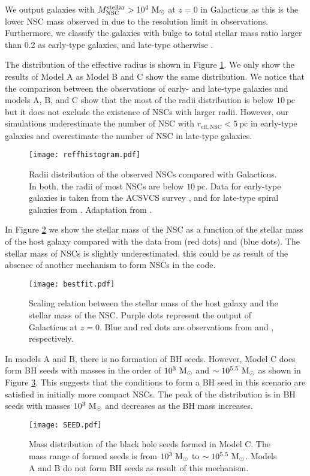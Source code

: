 \documentclass[baaa]{baaa}
\begin{document}
We output galaxies with $M_\mathrm{NSC}^\mathrm{stellar} > 10^{4}~{\rm M}_\odot$ at $z=0$ in {\sc Galacticus} as this is the lower NSC mass observed in \cite{COTE2006,GEORGIEV2016,SPENGLER2017} due to the resolution limit in observations.   Furthermore, we classify the galaxies  with  bulge to total stellar mass ratio larger than 0.2 as early-type galaxies, and late-type otherwise \citep{GRAHAM2008}.

The distribution of the effective radius is shown in Figure \ref{Reff}. We only show the results of Model A  as Model B and C show the same distribution. We notice that the comparison between the observations of early- and late-type galaxies and models A, B, and C show that the most of the radii distribution is below $10~\mathrm{pc}$ but it does not exclude the existence of NSCs with larger radii.
 However, our simulations underestimate the number of NSC with $r_\mathrm{eff,NSC} < 5~\mathrm{pc}$  in early-type galaxies and overestimate the number of NSC in late-type galaxies.

\begin{figure}[!t]
\texttt{[image: reffhistogram.pdf]}
\caption{Radii distribution of the observed NSCs compared with {\sc Galacticus}. In both, the radii of most NSCs are below $10~\mathrm{pc}$. Data for early-type galaxies is taken from the ACSVCS survey \cite{COTE2006}, and
for late-type spiral galaxies from \cite{GEORGIEV2016}. Adaptation from \cite{NEUMAYER2020}.}\label{Reff}
\end{figure}

In Figure \ref{Scale} we show the stellar mass of the NSC as a function of the stellar mass of the host galaxy compared with the data from \cite{SPENGLER2017} (red dots) and \cite{GEORGIEV2016} (blue dots). The stellar mass of NSCs is slightly underestimated, this could be as result of the absence of another mechanism to form NSCs in the code.

\begin{figure}[!t]
\texttt{[image: bestfit.pdf]}
\caption{Scaling relation between the stellar mass of the host galaxy and the stellar mass of the NSC. Purple dots represent the output of {\sc Galacticus} at $z=0$. Blue and red dots are observations from \cite{GEORGIEV2016} and \cite{SPENGLER2017}, respectively. }\label{Scale}
\end{figure}

In models A and B, there is no formation of BH seeds. However, Model C does form BH seeds with masses in the order of $10^{3}~{\rm M}_\odot$ and $\sim10^{5.5}~{\rm M}_\odot$ as shown in Figure \ref{seed}. 
This suggests that the conditions to form a BH seed in this scenario are satisfied in initially more compact NSCs. The peak of the distribution is in BH seeds with masses $10^{3}~{\rm M}_\odot$ and decreases as the BH mass increases.
\begin{figure}[!t]
\texttt{[image: SEED.pdf]}
\caption{Mass distribution of the  black hole seeds formed in Model C. The mass range of formed seeds is from $10^{3}~{\rm M}_\odot$ to $\sim10^{5.5}~ {\rm M}_\odot$.
Models A and B do not form BH seeds as result of this mechanism.}\label{seed}
\end{figure}
\end{document}
